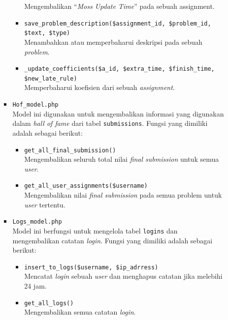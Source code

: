 \documentclass[a4paper,twoside]{article}
\begin{document}
\begin{enumerate}
\begin{itemize}
\begin{itemize}
\begin{itemize}
				                        Mengembalikan ``\textit{Moss Update Time}'' pada sebuah assignment.
				                  \item \verb|save_problem_description($assignment_id, $problem_id, $text, $type)| \\
				                        Menambahkan atau memperbaharui deskripsi pada sebuah \textit{problem}.
				                  \item \verb|_update_coefficients($a_id, $extra_time, $finish_time, $new_late_rule)| \\
				                        Memperbaharui koefisien dari sebuah \textit{assignment}.
			                  \end{itemize}

			            \item \verb|Hof_model.php| \\
			                  Model ini digunakan untuk mengembalikan informasi yang digunakan dalam \textit{hall of fame} dari tabel \verb|submissions|. Fungsi yang dimiliki adalah sebagai berikut:

			                  \begin{itemize}
				                  \item \verb|get_all_final_submission()| \\
				                        Mengembalikan seluruh total nilai \textit{final submission} untuk semua \textit{user}.
				                  \item \verb|get_all_user_assignments($username)| \\
				                        Mengembalikan nilai \textit{final submission} pada semua problem untuk \textit{user} tertentu.
			                  \end{itemize}

			            \item \verb|Logs_model.php| \\
			                  Model ini berfungsi untuk mengelola tabel \verb|logins| dan mengembalikan catatan \textit{login}. Fungsi yang dimiliki adalah sebagai berikut:

			                  \begin{itemize}
				                  \item \verb|insert_to_logs($username, $ip_adrress)| \\
				                        Mencatat \textit{login} sebuah \textit{user} dan menghapus catatan jika melebihi 24 jam.
				                  \item \verb|get_all_logs()| \\
				                        Mengembalikan semua catatan \textit{login}.
			                  \end{itemize}


\end{itemize}
\end{itemize}
\end{enumerate}
\end{document}
